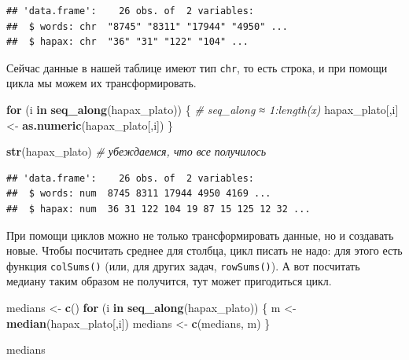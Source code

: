 \documentclass[
]{book}
\newenvironment{Shaded}{\begin{snugshade}}{\end{snugshade}}
\newcommand{\CommentTok}[1]{\textcolor[rgb]{0.56,0.35,0.01}{\textit{#1}}}
\newcommand{\ControlFlowTok}[1]{\textcolor[rgb]{0.13,0.29,0.53}{\textbf{#1}}}
\newcommand{\FunctionTok}[1]{\textcolor[rgb]{0.13,0.29,0.53}{\textbf{#1}}}
\newcommand{\NormalTok}[1]{#1}
\newcommand{\OtherTok}[1]{\textcolor[rgb]{0.56,0.35,0.01}{#1}}
\newcommand{\SpecialCharTok}[1]{\textcolor[rgb]{0.81,0.36,0.00}{\textbf{#1}}}
\theoremstyle{definition}
\theoremstyle{definition}
\theoremstyle{definition}
\theoremstyle{definition}
\theoremstyle{remark}
\begin{document}
\begin{Shaded}
\end{Shaded}

\begin{verbatim}
## 'data.frame':    26 obs. of  2 variables:
##  $ words: chr  "8745" "8311" "17944" "4950" ...
##  $ hapax: chr  "36" "31" "122" "104" ...
\end{verbatim}

Сейчас данные в нашей таблице имеют тип \texttt{chr}, то есть строка, и при помощи цикла мы можем их трансформировать.

\begin{Shaded}
\begin{Highlighting}[]
\ControlFlowTok{for}\NormalTok{ (i }\ControlFlowTok{in} \FunctionTok{seq\_along}\NormalTok{(hapax\_plato)) \{  }\CommentTok{\# seq\_along ≈ 1:length(x)}
\NormalTok{  hapax\_plato[,i] }\OtherTok{\textless{}{-}} \FunctionTok{as.numeric}\NormalTok{(hapax\_plato[,i])}
\NormalTok{\}}

\FunctionTok{str}\NormalTok{(hapax\_plato) }\CommentTok{\# убеждаемся, что все получилось}
\end{Highlighting}
\end{Shaded}

\begin{verbatim}
## 'data.frame':    26 obs. of  2 variables:
##  $ words: num  8745 8311 17944 4950 4169 ...
##  $ hapax: num  36 31 122 104 19 87 15 125 12 32 ...
\end{verbatim}

При помощи циклов можно не только трансформировать данные, но и создавать новые. Чтобы посчитать среднее для столбца, цикл писать не надо: для этого есть функция \texttt{colSums()} (или, для других задач, \texttt{rowSums()}). А вот посчитать медиану таким образом не получится, тут может пригодиться цикл.

\begin{Shaded}
\begin{Highlighting}[]
\NormalTok{medians }\OtherTok{\textless{}{-}} \FunctionTok{c}\NormalTok{()}
\ControlFlowTok{for}\NormalTok{ (i }\ControlFlowTok{in} \FunctionTok{seq\_along}\NormalTok{(hapax\_plato)) \{ }
\NormalTok{  m }\OtherTok{\textless{}{-}} \FunctionTok{median}\NormalTok{(hapax\_plato[,i])}
\NormalTok{  medians }\OtherTok{\textless{}{-}} \FunctionTok{c}\NormalTok{(medians, m)}
\NormalTok{\}}

\NormalTok{medians}
\end{Highlighting}
\end{Shaded}
\end{document}
